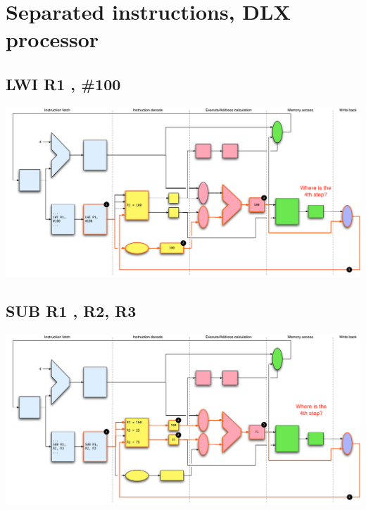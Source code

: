 \documentclass[a4paper,10pt]{article}
\begin{document}
	
	
	
	
	\section{Separated instructions, DLX processor }
		\subsection{LWI R1 , \#100}
		\begin{center}
					 \includegraphics[width=1.1\textwidth]{./images/lwi}
		\end{center}

			
		\subsection{SUB R1 , R2, R3}
		\begin{center}
					 \includegraphics[width=1.1\textwidth]{./images/sub}
		\end{center}

		
\end{document}
